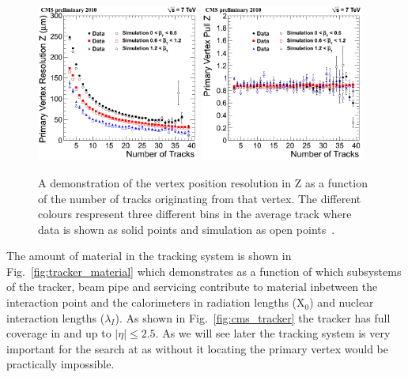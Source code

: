 \begin{figure}
  \includegraphics[width=0.48\textwidth]{cms_experiment/plots/ResZ_byPt.png}
  \includegraphics[width=0.48\textwidth]{cms_experiment/plots/PullZ_byPt.png}
  \caption[Vertex resolution]{A demonstration of the vertex position resolution in Z as a function of the number of tracks originating from that vertex. The different colours respresent three different bins in the average track \pT where data is shown as solid points and simulation as open points~\cite{cms-tracker-performance-2010}.}
  \label{fig:tracker_vertex_resolution}
\end{figure}

The amount of material in the tracking system is shown in Fig.~\ref{fig:tracker_material} which demonstrates as a function of \eta which subsystems of the tracker, beam pipe and servicing contribute to material inbetween the interaction point and the calorimeters in radiation lengths (X$_{0}$) and nuclear interaction lengths ($\lambda_{I}$). As shown in Fig.~\ref{fig:cms_tracker} the tracker has full coverage in \phi and up to $|\eta|\leq2.5$. As we will see later the tracking system is very important for the \Hgg search at \CMS as without it locating the primary vertex would be practically impossible.

